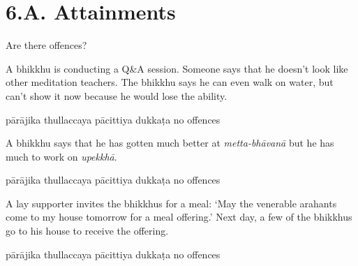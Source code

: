 \chapter{6.A. Attainments}
\renewcommand*{\theChapterTitle}{6.A. Attainments}

\begin{exam}{\autoExamName}

\begin{problem*}

  Are there offences?

\begin{parts}

\item A bhikkhu is conducting a Q\&A session.
  Someone says that he doesn't look like other meditation teachers.
  The bhikkhu says he can even walk on water, but can't show it now because he would lose the ability.

  \bigskip

  \begin{answers}{5}
    \bChoices
     pārājika\eAns
     thullaccaya\eAns
     pācittiya\eAns
     dukkaṭa\eAns
     no offences\eAns
    \eChoices
  \end{answers}

  \bigskip

\item A bhikkhu says that he has gotten much better at \emph{metta-bhāvanā} but
  he has much to work on \textit{upekkhā}.

  \bigskip

  \begin{answers}{5}
    \bChoices
     pārājika\eAns
     thullaccaya\eAns
     pācittiya\eAns
     dukkaṭa\eAns
     no offences\eAns
    \eChoices
  \end{answers}

  \bigskip

\item A lay supporter invites the bhikkhus for a meal: `May the venerable
  arahants come to my house tomorrow for a meal offering.' Next day, a few of
  the bhikkhus go to his house to receive the offering.

  \bigskip

  \begin{answers}{5}
    \bChoices
     pārājika\eAns
     thullaccaya\eAns
     pācittiya\eAns
     dukkaṭa\eAns
     no offences\eAns
    \eChoices
  \end{answers}


\end{parts}
\end{problem*}
\end{exam}

